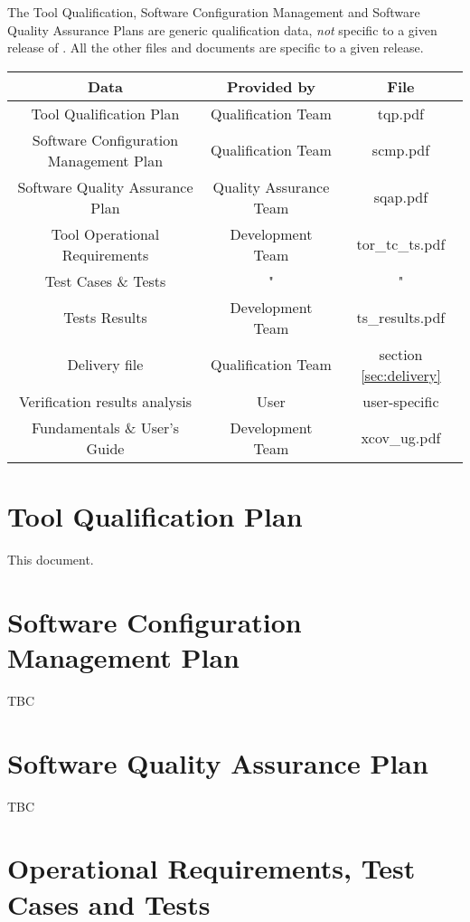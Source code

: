 \documentclass {report}
\begin{document}
The Tool Qualification, Software Configuration Management and Software Quality
Assurance Plans are generic qualification data, \emph{not} specific to a given
release of \xcov{}.
%
All the other files and documents are specific to a given \xcov{}
release.

\begin{tabular}{|c|c|c|}
\hline
\textbf{Data} & \textbf{Provided by} & \textbf{File} \\ \hline\hline
Tool Qualification Plan & Qualification Team & tqp.pdf \\ \hline
Software Configuration Management Plan & Qualification Team & scmp.pdf \\ \hline
Software Quality Assurance Plan & Quality Assurance Team & sqap.pdf \\ \hline
Tool Operational Requirements & Development Team & tor\_tc\_ts.pdf \\ \hline
Test Cases \& Tests & " & " \\ \hline
Tests Results & Development Team & ts\_results.pdf \\ \hline
Delivery file & Qualification Team & section \ref{sec:delivery} \\ \hline
Verification results analysis & User & user-specific \\ \hline
\xcov{} Fundamentals \& User's Guide & Development Team & xcov\_ug.pdf \\ \hline
\end{tabular}

\section{Tool Qualification Plan}

This document.

\section{Software Configuration Management Plan}

TBC

\section{Software Quality Assurance Plan}

TBC

\section{Operational Requirements, Test Cases and Tests}
\end{document}
